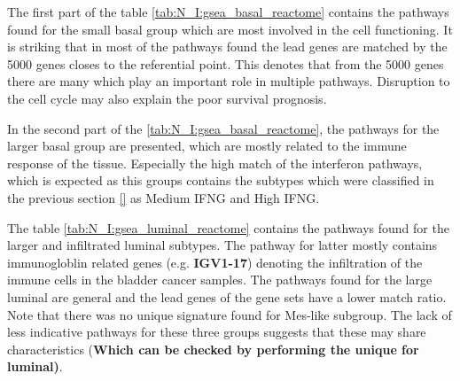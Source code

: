 The first part of the table \cref{tab:N_I:gsea_basal_reactome} contains the pathways found for the small basal group which are most involved in the cell functioning. It is striking that in most of the pathways found the lead genes are matched by the 5000 genes closes to the referential point. This denotes that from the 5000 genes there are many which play an important role in multiple pathways. Disruption to the cell cycle may also explain the poor survival prognosis. 

In the second part of the \cref{tab:N_I:gsea_basal_reactome}, the pathways for the larger basal group are presented, which are mostly related to the immune response of the tissue. Especially the high match of the interferon pathways, which is expected as this groups contains the subtypes which were classified in the previous section \ref{} as Medium IFNG and High IFNG.

The table \cref{tab:N_I:gsea_luminal_reactome} contains the pathways found for the larger and infiltrated luminal subtypes. The pathway for latter mostly contains immunogloblin related genes (e.g. \textbf{IGV1-17}) denoting the infiltration of the immune cells in the bladder cancer samples. The pathways found for the large luminal are general and the lead genes of the gene sets have a lower match ratio. Note that there was no unique signature found for Mes-like subgroup. The lack of less indicative pathways for these three groups suggests that these may share characteristics (\textbf{Which can be checked by performing the unique for luminal)}.

